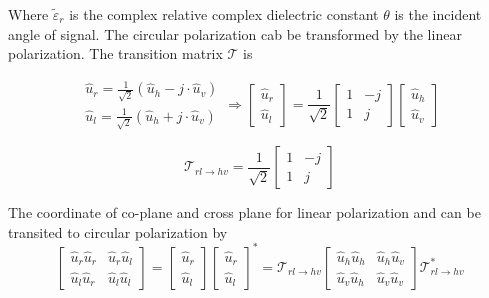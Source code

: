 \documentclass[draftcls,onecolumn]{IEEEtran}  %
\begin{document}
Where $\tilde{\varepsilon}_r$ is the complex relative complex dielectric constant  $\theta$ is the incident angle of signal. The circular polarization cab be transformed by the linear polarization. The transition matrix $\mathcal{T}$ is

\begin{equation*}
	\begin{matrix}
	\hat{u}_{r} = \frac{1}{\sqrt{2}}(\hat{u}_h - j\cdot \hat{u}_v) \\
	\hat{u}_{l} = \frac{1}{\sqrt{2}}(\hat{u}_h + j\cdot \hat{u}_v)
	\end{matrix}
	\Rightarrow 
	\begin{bmatrix}
	\hat{u}_{r} \\
	\hat{u}_{l}
	\end{bmatrix}= \frac{1}{\sqrt{2}}	 
	\begin{bmatrix}
	1 & -j \\
	1 & j
	\end{bmatrix}	
	\begin{bmatrix}
	\hat{u}_{h} \\
	\hat{u}_{v}
	\end{bmatrix}
\end{equation*}

\begin{equation}
	\mathcal{T}_{rl \rightarrow hv} =  \frac{1}{\sqrt{2}}	
	\begin{bmatrix}
	1 & -j \\
	1 & j
	\end{bmatrix}
\end{equation}

The coordinate of co-plane and cross plane for linear polarization and  can be transited to circular polarization by
\begin{equation}
 	\begin{bmatrix}
	\hat{u}_{r}\hat{u}_{r} & \hat{u}_{r}\hat{u}_{l} \\
	\hat{u}_{l}\hat{u}_{r} & \hat{u}_{l}\hat{u}_{l}
	\end{bmatrix} = 
	\begin{bmatrix}
	\hat{u}_{r} \\
	\hat{u}_{l} 
	\end{bmatrix}
	\begin{bmatrix}
	\hat{u}_{r} \\
	\hat{u}_{l} 
	\end{bmatrix}^* = 
	\mathcal{T}_{rl \rightarrow hv}
	\begin{bmatrix}
	\hat{u}_{h}\hat{u}_{h} & \hat{u}_{h}\hat{u}_{v} \\
	\hat{u}_{v}\hat{u}_{h} & \hat{u}_{v}\hat{u}_{v}
	\end{bmatrix}
	\mathcal{T}_{rl \rightarrow hv}^*
\end{equation}
\end{document}
